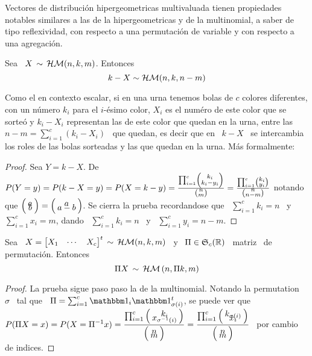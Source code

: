 Vectores  de  distribuci\'on  hipergeometricas multivaluada  tienen  propiedades
notables similares a las de la  hipergeometricas y de la multinomial, a saber de
tipo reflexividad, con respecto a una permutaci\'on de variable y con respecto a
una agregaci\'on.
%
\begin{lema}[Reflexividad]
\label{Lem:MP:ReflexividadHipergeomMulti}
%
  Sea \ $X \, \sim \, \mathcal{H}\mathcal{M}(n,k,m)$. Entonces
  \[
  k-X \sim \mathcal{H}\mathcal{M}(n,k,n-m)
  \]
\end{lema}
%
Como  el en  contexto  escalar, si  en una  urna  tenemos bolas  de $c$  colores
diferentes,  con  un n\'umero  $k_i$  para el  $i$-\'esimo  color,  $X_i$ es  el
num\'ero de este color que se sorte\'o y $k_i-X_i$ representan las de este color
que quedan en la urna, entre las  \ $n-m = \sum_{i=1}^c (k_i-X_i)$ \ que quedan,
es decir que en \ $k-X$ \ se  intercambia los roles de las bolas sorteadas y las
que quedan en la urna. M\'as formalmente:
%
\begin{proof}
  Sea $Y =  k-X$. De $P(Y = y) =  P(k-X = y) = P(X  = k-y) = \frac{\prod_{i=1}^c
    \smallbino{k_i}{k_i-y_i}}{\smallbino{n}{m}}       =      \frac{\prod_{i=1}^c
    \smallbino{k_i}{y_i}}{\smallbino{n}{n-m}}$   notando   que  $\bino{a}{b}   =
  \bino{a}{a-b}$. Se cierra la prueba  recordandose que \ $\sum_{i=1}^c k_i = n$
  \  y  \ $\sum_{i=1}^c  x_i  =  m$,  dando \  $\sum_{i=1}^c  k_i  =  n$ \  y  \
  $\sum_{i=1}^c y_i = n-m$.
\end{proof}
%
\begin{lema}\label{Lem:MP:PermutacionHipergeomMulti}
%
  Sea  \ $X =  \begin{bmatrix} X_1  & \cdots  & X_c  \end{bmatrix}^t \,  \sim \,
  \mathcal{H}\mathcal{M}(n,k,m)$  \   y  \   $\Pi  \in  \mathfrak{S}_c(\mathbb{R})$   \  matriz   \  de
  permutaci\'on. Entonces
  \[
  \Pi X \, \sim \, \mathcal{H}\mathcal{M}\left( n ,  \Pi k , m \right)
  \]
\end{lema}
%
\begin{proof}
  La  prueba sigue  paso paso  la de  la multinomial.  Notando la  permutation \
  $\sigma$ \  tal que \ $\Pi  = \sum_{i=1}^c \un_i  \un_{\sigma(i)}^t$, se puede
  ver   que  \  $\displaystyle   P(\Pi  X   =  x)   =  P(X   =  \Pi^{-1}   x)  =
  \frac{\prod_{i=1}^c       \bino{k_i}{x_{\sigma^{-1}(i)}}}{\bino{n}{m}}       =
  \frac{\prod_{i=1}^c \bino{k_{\sigma(i)}}{x_i}}{\bino{n}{m}} $  \ por cambio de
  indices.
\end{proof}
